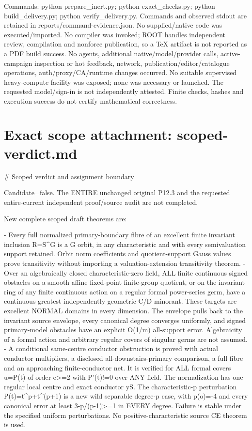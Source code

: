 \documentclass[11pt]{article}
\begin{document}
Commands: python prepare\_inert.py; python exact\_checks.py; python build\_delivery.py; python verify\_delivery.py. Commands and observed stdout are retained in reports/command-evidence.json. No supplied/native code was executed/imported. No compiler was invoked; ROOT handles independent review, compilation and nonforce publication, so a TeX artifact is not reported as a PDF build success. No agents, additional native/model/provider calls, active-campaign inspection or hot feedback, network, publication/editor/catalogue operations, auth/proxy/CA/runtime changes occurred. No suitable supervised heavy-compute facility was exposed; none was necessary or launched. The requested model/sign-in is not independently attested. Finite checks, hashes and execution success do not certify mathematical correctness.

\section{Exact scope attachment: scoped-verdict.md}
\# Scoped verdict and assignment boundary

Candidate=false. The ENTIRE unchanged original P12.3 and the requested entire-current independent proof/source audit are not completed.

New complete scoped draft theorems are:

- Every full normalized primary-boundary fibre of an excellent finite invariant inclusion R=S\textasciicircum{}G is a G orbit, in any characteristic and with every semivaluation support retained. Orbit norm coefficients and quotient-support Gauss values prove transitivity without importing a valuation-extension transitivity theorem.
- Over an algebraically closed characteristic-zero field, ALL finite continuous signed obstacles on a smooth affine fixed-point finite-group quotient, or on the invariant ring of any finite continuous action on a regular formal power-series germ, have a continuous greatest independently geometric C/D minorant. These targets are excellent NORMAL domains in every dimension. The envelope pulls back to the invariant source envelope, every canonical degree converges uniformly, and signed primary-model obstacles have an explicit O(1/m) all-support error. Algebraicity of a formal action and arbitrary regular covers of singular germs are not assumed.
- A conditional same-centre conductor obstruction is proved with actual conductor multipliers, a disclosed all-downstairs-primary comparison, a full fibre and an approaching finite-conductor net. It is verified for ALL formal covers u=P(t) of order e>=2 with P'(t)!=0 over ANY field. The normalization has one regular local centre and exact conductor yS. The characteristic-p perturbation P(t)=t\textasciicircum{}p+t\textasciicircum{}(p+1) is a new wild separable degree-p case, with p(o)=-4 and every canonical error at least 3-p/(p-1)>=1 in EVERY degree. Failure is stable under the specified uniform perturbations. No positive-characteristic source CE theorem is used.
\end{document}
